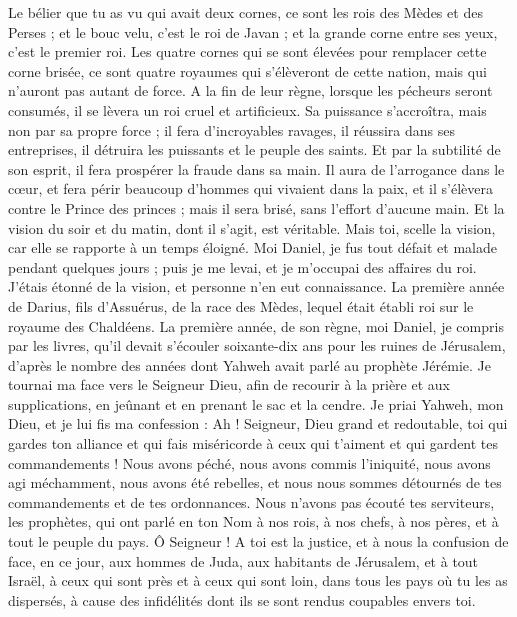 \begin{multicols}{2}
Le bélier que tu as vu qui avait deux cornes, ce sont les rois des Mèdes et des Perses ;
et le bouc velu, c'est le roi de Javan ; et la grande corne entre ses yeux, c'est le premier roi.
Les quatre cornes qui se sont élevées pour remplacer cette corne brisée, ce sont quatre royaumes qui s’élèveront de cette nation, mais qui n’auront pas autant de force.
A la fin de leur règne, lorsque les pécheurs seront consumés, il se lèvera un roi cruel et artificieux.
Sa puissance s'accroîtra, mais non par sa propre force ; il fera d’incroyables ravages, il réussira dans ses entreprises, il détruira les puissants et le peuple des saints.
Et par la subtilité de son esprit, il fera prospérer la fraude dans sa main. Il aura de l’arrogance dans le cœur, et fera périr beaucoup d’hommes qui vivaient dans la paix, et il s’élèvera contre le Prince des princes ; mais il sera brisé, sans l’effort d’aucune main.
Et la vision du soir et du matin, dont il s’agit, est véritable. Mais toi, scelle la vision, car elle se rapporte à un temps éloigné.
Moi Daniel, je fus tout défait et malade pendant quelques jours ; puis je me levai, et je m’occupai des affaires du roi.  J’étais étonné de la vision, et personne n’en eut connaissance.
\VerseOne{}La première année de Darius, fils d'Assuérus, de la race des Mèdes, lequel était établi roi sur le royaume des Chaldéens.
La première année, de son règne, moi Daniel, je compris par les livres, qu’il devait s’écouler soixante-dix ans pour les ruines de Jérusalem, d’après le nombre des années dont Yahweh avait parlé au prophète Jérémie.
Je tournai ma face vers le Seigneur Dieu, afin de recourir à la prière et aux supplications, en jeûnant et en prenant le sac et la cendre.
Je priai Yahweh, mon Dieu, et je lui fis ma confession : Ah ! Seigneur, Dieu grand et redoutable, toi qui gardes ton alliance et qui fais  miséricorde à ceux qui t'aiment et qui gardent tes commandements !
Nous avons péché, nous avons commis l'iniquité, nous avons agi méchamment, nous avons été rebelles, et nous nous sommes détournés de tes commandements et de tes ordonnances.
Nous n'avons pas écouté tes serviteurs, les prophètes, qui ont parlé en ton Nom à nos rois, à nos chefs, à nos pères, et à tout le peuple du pays.
Ô Seigneur ! A toi est la justice, et à nous la confusion de face, en ce jour, aux hommes de Juda, aux habitants de Jérusalem, et à tout Israël, à ceux qui sont près et à ceux qui sont loin, dans tous les pays où tu les as dispersés, à cause des infidélités dont ils se sont rendus coupables envers toi.

\end{multicols}
